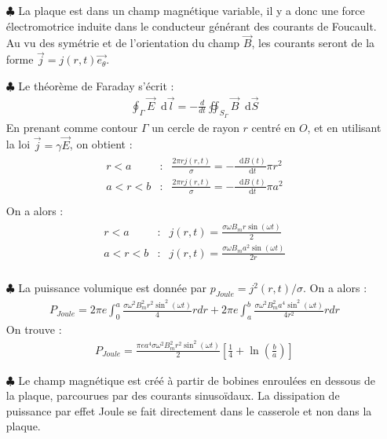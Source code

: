 \documentclass{report}
\newcommand*\dif{\mathop{}\!\mathrm{d}}
\begin{document}
\begin{itemize}

	\item[$\clubsuit$] La plaque est dans un champ magnétique variable, il y a donc une force électromotrice induite dans le conducteur générant des courants de Foucault. Au vu des symétrie et de l'orientation du champ $\vec{B}$, les courants seront de la forme $\vec{j}=j(r,t)\vec{e_\theta}$.
	
	\item[$\clubsuit$] Le théorème de Faraday s'écrit :
	\begin{align*}
		\oint_\Gamma\vec{E}\dif\vec{l}=-\frac{d}{dt}\oiint_{S_\Gamma}\vec{B}\dif\vec{S}
	\end{align*}
	En prenant comme contour $\Gamma$ un cercle de rayon $r$ centré en $O$, et en utilisant la loi $\vec{j}=\gamma\vec{E}$, on obtient :
	\begin{align*}
	\begin{array}{ccc}
	r<a & : & \frac{2\pi rj(r,t)}{\sigma}=-\frac{\dif B(t)}{\dif t}\pi r^2\\
	a<r<b & : & \frac{2\pi rj(r,t)}{\sigma}=-\frac{\dif B(t)}{\dif t}\pi a^2\\
	\end{array}
	\end{align*}		
On a alors :
	\begin{align*}
	\begin{array}{ccc}
	r<a & : & j(r,t)=\frac{\sigma\omega B_m r\sin(\omega t)}{2}\\
	a<r<b & : &  j(r,t)=\frac{\sigma\omega B_m a^2\sin(\omega t)}{2r}\\
	\end{array}
	\end{align*}		
		
	\item[$\clubsuit$] La puissance volumique est donnée par $p_{Joule}= j^2(r,t)/\sigma$. On a alors :
	\begin{align*}
		P_{Joule}=2\pi e\int_0^a \frac{\sigma\omega^2 B_m^2 r^2\sin^2(\omega t)}{4}rdr+2\pi e\int_a^b \frac{\sigma\omega^2 B_m^2 a^4\sin^2(\omega t)}{4r^2}rdr
	\end{align*}
	On trouve :
	\begin{align*}
		P_{Joule}=\frac{\pi e a^4\sigma\omega^2 B_m^2 r^2\sin^2(\omega t)}{2}\left[\frac{1}{4} + \ln\left(\frac{b}{a} \right)  \right] 
	\end{align*}
	
	\item[$\clubsuit$] Le champ magnétique est créé à partir de bobines enroulées en dessous de la plaque, parcourues par des courants sinusoïdaux. La dissipation de puissance par effet Joule se fait directement dans le casserole et non dans la plaque.
	

\end{itemize}
\end{document}
